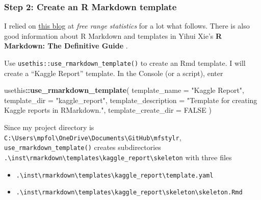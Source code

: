 \documentclass[
]{book}
\newenvironment{Shaded}{\begin{snugshade}}{\end{snugshade}}
\newcommand{\DataTypeTok}[1]{\textcolor[rgb]{0.13,0.29,0.53}{#1}}
\newcommand{\KeywordTok}[1]{\textcolor[rgb]{0.13,0.29,0.53}{\textbf{#1}}}
\newcommand{\NormalTok}[1]{#1}
\newcommand{\OperatorTok}[1]{\textcolor[rgb]{0.81,0.36,0.00}{\textbf{#1}}}
\newcommand{\OtherTok}[1]{\textcolor[rgb]{0.56,0.35,0.01}{#1}}
\newcommand{\StringTok}[1]{\textcolor[rgb]{0.31,0.60,0.02}{#1}}
\providecommand{\tightlist}{%
  \setlength{\itemsep}{0pt}\setlength{\parskip}{0pt}}
\begin{document}
\hypertarget{step-2-create-an-r-markdown-template}{%
\subsubsection*{Step 2: Create an R Markdown template}\label{step-2-create-an-r-markdown-template}}

I relied on \href{http://freerangestats.info/blog/2017/09/09/rmarkdown}{this blog} at \emph{free range statistics} for a lot what follows. There is also good information about R Markdown and templates in Yihui Xie's \textbf{R Markdown: The Definitive Guide} \citep{Xie2019b}.

Use \texttt{usethis::use\_rmarkdown\_template()} to create an Rmd template. I will create a ``Kaggle Report'' template. In the Console (or a script), enter

\begin{Shaded}
\begin{Highlighting}[]
\NormalTok{usethis}\OperatorTok{::}\KeywordTok{use_rmarkdown_template}\NormalTok{(}
  \DataTypeTok{template_name =} \StringTok{"Kaggle Report"}\NormalTok{,}
  \DataTypeTok{template_dir =} \StringTok{"kaggle_report"}\NormalTok{,}
  \DataTypeTok{template_description =} \StringTok{"Template for creating Kaggle reports in RMarkdown."}\NormalTok{,}
  \DataTypeTok{template_create_dir =} \OtherTok{FALSE}
\NormalTok{)}
\end{Highlighting}
\end{Shaded}

Since my project directory is \texttt{C:\textbackslash{}Users\textbackslash{}mpfol\textbackslash{}OneDrive\textbackslash{}Documents\textbackslash{}GitHub\textbackslash{}mfstylr}, \texttt{use\_rmarkdown\_template()} creates subdirectories \texttt{.\textbackslash{}inst\textbackslash{}rmarkdown\textbackslash{}templates\textbackslash{}kaggle\_report\textbackslash{}skeleton} with three files

\begin{itemize}
\tightlist
\item
  \texttt{.\textbackslash{}inst\textbackslash{}rmarkdown\textbackslash{}templates\textbackslash{}kaggle\_report\textbackslash{}template.yaml}
\item
  \texttt{.\textbackslash{}inst\textbackslash{}rmarkdown\textbackslash{}templates\textbackslash{}kaggle\_report\textbackslash{}skeleton\textbackslash{}skeleton.Rmd}
\end{itemize}
\end{document}
